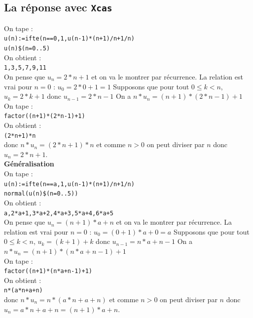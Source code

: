 \documentclass[a4paper,11pt]{book}
\begin{document}
\subsection{La r\'eponse avec {\tt Xcas}}
On tape :\\
{\tt u(n):=ifte(n==0,1,u(n-1)*(n+1)/n+1/n)}\\
{\tt u(n)\$(n=0..5)}\\
On obtient :\\
{\tt 1,3,5,7,9,11}\\
On pense que $u_n=2*n+1$ et on va le montrer par r\'ecurrence.
La relation est vrai pour $n=0$ : $u_0=2*0+1=1$
Supposons que pour tout $0\leq k<n$, $u_k=2*k+1$ donc $u_{n-1}=2*n-1$
On a $n*u_n=(n+1)*(2*n-1)+1$\\
On tape :\\
{\tt factor((n+1)*(2*n-1)+1)}\\
On obtient :\\
{\tt (2*n+1)*n}\\
donc $n*u_n=(2*n+1)*n$ et comme $n>0$ on peut diviser par $n$ donc
$u_n=2*n+1$.\\
{\bf G\'en\'eralisation}\\
On tape :\\
{\tt u(n):=ifte(n==a,1,u(n-1)*(n+1)/n+1/n)}\\
{\tt normal(u(n)\$(n=0..5))}\\
On obtient :\\
{\tt a,2*a+1,3*a+2,4*a+3,5*a+4,6*a+5}\\
On pense que $u_n=(n+1)*a+n$ et on va le montrer par r\'ecurrence.
La relation est vrai pour $n=0$ : $u_0=(0+1)*a+0=a$
Supposons que pour tout $0\leq k<n$, $u_k=(k+1)+k$ donc $u_{n-1}=n*a+n-1$
On a $n*u_n=(n+1)*(n*a+n-1)+1$\\
On tape :\\
{\tt factor((n+1)*(n*a+n-1)+1)}\\
On obtient :\\
{\tt n*(a*n+a+n)}\\
donc $n*u_n=n*(a*n+a+n)$ et comme $n>0$ on peut diviser par $n$ donc
$u_n=a*n+a+n=(n+1)*a+n$.
\end{document}

